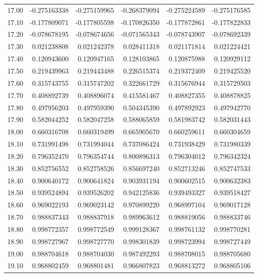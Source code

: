\documentclass[11pt,a4paper]{article}
\begin{document}
\begin{longtable}{rrrrrr}
17.00 & -0.275163338 & -0.275159965 & -0.268379094 & -0.275224589 & -0.275176585 \\
17.10 & -0.177809071 & -0.177805598 & -0.170826350 & -0.177872861 & -0.177822833 \\
17.20 & -0.078678195 & -0.078674656 & -0.071565343 & -0.078743907 & -0.078692339 \\
17.30 & 0.021238808 & 0.021242378 & 0.028411318 & 0.021171814 & 0.021224421 \\
17.40 & 0.120943600 & 0.120947165 & 0.128103865 & 0.120875988 & 0.120929112 \\
17.50 & 0.219439963 & 0.219443488 & 0.226515374 & 0.219372409 & 0.219425520 \\
17.60 & 0.315743755 & 0.315747202 & 0.322661729 & 0.315676944 & 0.315729503 \\
17.70 & 0.408892739 & 0.408896074 & 0.415581467 & 0.408827355 & 0.408878825 \\
17.80 & 0.497956203 & 0.497959390 & 0.504345390 & 0.497892923 & 0.497942770 \\
17.90 & 0.582044252 & 0.582047258 & 0.588065859 & 0.581983742 & 0.582031443 \\
18.00 & 0.660316708 & 0.660319499 & 0.665905670 & 0.660259611 & 0.660304659 \\
18.10 & 0.731991498 & 0.731994044 & 0.737086424 & 0.731938429 & 0.731980339 \\
18.20 & 0.796352470 & 0.796354744 & 0.800896313 & 0.796304012 & 0.796342324 \\
18.30 & 0.852756552 & 0.852758526 & 0.856697240 & 0.852713246 & 0.852747533 \\
18.40 & 0.900640172 & 0.900641824 & 0.903931194 & 0.900602515 & 0.900632383 \\
18.50 & 0.939524894 & 0.939526202 & 0.942125836 & 0.939493327 & 0.939518427 \\
18.60 & 0.969022193 & 0.969023142 & 0.970899220 & 0.968997104 & 0.969017128 \\
18.70 & 0.988837343 & 0.988837918 & 0.989963612 & 0.988819056 & 0.988833746 \\
18.80 & 0.998772357 & 0.998772549 & 0.999128367 & 0.998761132 & 0.998770281 \\
18.90 & 0.998727967 & 0.998727770 & 0.998301839 & 0.998723994 & 0.998727449 \\
19.00 & 0.988704618 & 0.988704030 & 0.987492293 & 0.988708015 & 0.988705680 \\
19.10 & 0.968802459 & 0.968801481 & 0.966807823 & 0.968813272 & 0.968805106 \\

\end{longtable}
\end{document}
